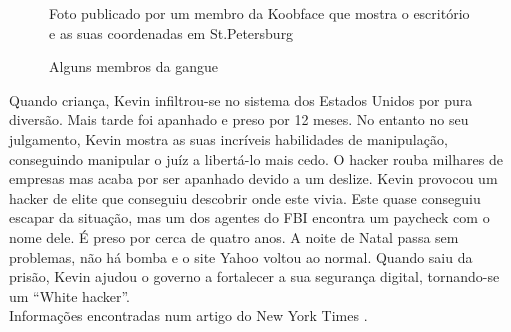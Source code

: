 \documentclass{report}
\begin{document}
\begin{figure}[h]
    \center
    \caption{Foto publicado por um membro da Koobface que mostra o escritório e as suas coordenadas em St.Petersburg}
    \label{koobface}
\end{figure}
\begin{figure} [h]
    \center
    \caption{Alguns membros da gangue}
    \label{membros}
\end{figure}

Quando criança, Kevin infiltrou-se no sistema dos Estados Unidos por pura diversão. Mais tarde foi apanhado e preso por 12 meses. No entanto no seu julgamento, Kevin mostra as suas incríveis habilidades de manipulação, conseguindo manipular o juíz a libertá-lo mais cedo. O hacker rouba milhares de empresas mas acaba por ser apanhado devido a um deslize. Kevin provocou um hacker de elite que conseguiu descobrir onde este vivia. Este quase conseguiu escapar da situação, mas um dos agentes do FBI encontra um paycheck com o nome dele. É preso por cerca de quatro anos. A noite de Natal passa sem problemas, não há bomba e o site Yahoo voltou ao normal. Quando saiu da prisão, Kevin ajudou o governo a fortalecer a sua segurança digital, tornando-se um “White hacker”.
\\ Informações encontradas num artigo do New York Times \cite{newyorktimes}. 
\end{document}
